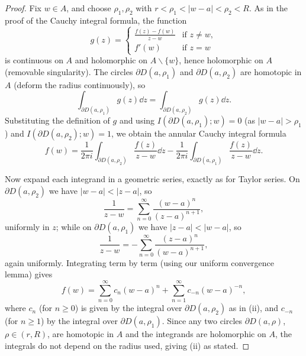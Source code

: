 \begin{proof}
    Fix $w \in A$, and choose $\rho_1, \rho_2$ with $r < \rho_1 < |w - a| < \rho_2 < R$. As in the proof of the Cauchy integral formula, the function
    $$
    g(z) = \begin{cases}
        \frac{f(z) - f(w)}{z - w} &\mbox{if } z \neq w, \\
        f'(w) &\mbox{if } z = w
       \end{cases}
    $$
    is continuous on $A$ and holomorphic on $A \backslash \{w\}$, hence holomorphic on $A$ (removable singularity). The circles $\partial D(a, \rho_1)$ and $\partial D(a, \rho_2)$ are homotopic in $A$ (deform the radius continuously), so
    $$
    \int_{\partial D(a, \rho_1)} g(z) \dd z = \int_{\partial D(a, \rho_2)} g(z) \dd z.
    $$
    Substituting the definition of $g$ and using $I(\partial D(a, \rho_1); w) = 0$ (as $|w - a| > \rho_1$) and $I(\partial D(a, \rho_2); w) = 1$, we obtain the annular Cauchy integral formula
    $$
    f(w) = \frac{1}{2\pi i}\int_{\partial D(a, \rho_2)} \frac{f(z)}{z - w} \dd z - \frac{1}{2 \pi i}\int_{\partial D(a, \rho_1)} \frac{f(z)}{z - w} \dd z.
    $$

    Now expand each integrand in a geometric series, exactly as for Taylor series. On $\partial D(a, \rho_2)$ we have $|w - a| < |z - a|$, so
    $$
    \frac{1}{z - w} = \sum_{n = 0}^{\infty} \frac{(w - a)^n}{(z - a)^{n + 1}},
    $$
    uniformly in $z$; while on $\partial D(a, \rho_1)$ we have $|z - a| < |w - a|$, so
    $$
    \frac{1}{z - w} = -\sum_{n = 0}^{\infty} \frac{(z - a)^n}{(w - a)^{n + 1}},
    $$
    again uniformly. Integrating term by term (using our uniform convergence lemma) gives
    $$
    f(w) = \sum_{n = 0}^{\infty} c_n (w - a)^n + \sum_{n = 1}^{\infty} c_{-n}(w - a)^{-n},
    $$
    where $c_n$ (for $n \geq 0$) is given by the integral over $\partial D(a, \rho_2)$ as in (ii), and $c_{-n}$ (for $n \geq 1$) by the integral over $\partial D(a, \rho_1)$. Since any two circles $\partial D(a, \rho)$, $\rho \in (r, R)$, are homotopic in $A$ and the integrands are holomorphic on $A$, the integrals do not depend on the radius used, giving (ii) as stated.


\end{proof}
